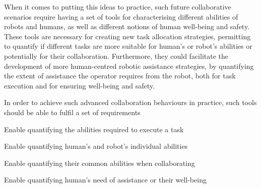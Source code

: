 When it comes to putting this ideas to practice, such future collaborative scenarios require having a set of tools for characterising different abilities of robots and humans, as well as different notions of human well-being and safety. These tools are necessary for creating new task allocation strategies, permitting to quantify if different tasks are more suitable for human's or robot's abilities or potentially for their collaboration. Furthermore, they could facilitate the development of more human-centred robotic assistance strategies, by quantifying the extent of assistance the operator requires from the robot, both for task execution and for ensuring well-being and safety.

In order to achieve such advanced collaboration behaviours in practice, such tools should be able to fulfil a set of requirements

\begin{requirement} \label{req:task}
     Enable quantifying the abilities required to execute a task
\end{requirement}
\begin{requirement} \label{req:individual}
     Enable quantifying human's and robot's individual abilities
\end{requirement}
\begin{requirement} \label{req:common}
     Enable quantifying their common abilities when collaborating
\end{requirement}
\begin{requirement} \label{req:safety}
     Enable quantifying human's need of assistance or their well-being
\end{requirement}





